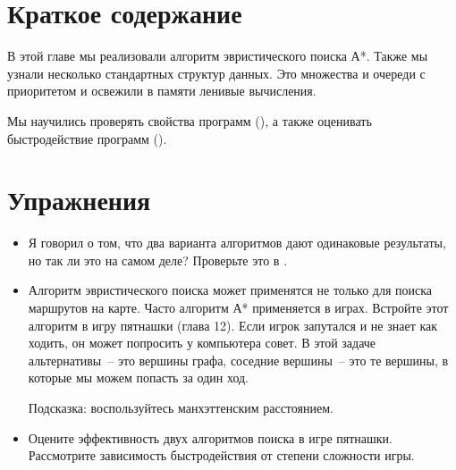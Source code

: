 \section{Краткое содержание}

В этой главе мы реализовали алгоритм эвристического поиска А*.
Также мы узнали несколько стандартных структур данных.
Это множества и очереди с приоритетом и освежили в памяти
ленивые вычисления. 

Мы научились проверять свойства программ (), а 
также оценивать быстродействие программ ().  

\section{Упражнения}

\begin{itemize}

\item Я говорил о том, что два варианта алгоритмов дают 
одинаковые результаты, но так ли это на самом деле? 
Проверьте это в .

\item Алгоритм эвристического поиска может применятся
не только для поиска маршрутов на карте. Часто алгоритм А*
применяется в играх. Встройте этот алгоритм в игру пятнашки (глава 12).
Если игрок запутался и не знает как ходить, он может попросить у 
компьютера совет. В этой задаче альтернативы~-- это вершины
графа, соседние вершины~-- это те вершины, в которые
мы можем попасть за один ход.

Подсказка: воспользуйтесь манхэттенским расстоянием.

\item Оцените эффективность двух алгоритмов поиска
в игре пятнашки. Рассмотрите зависимость быстродействия
от степени сложности игры.

\end{itemize}

